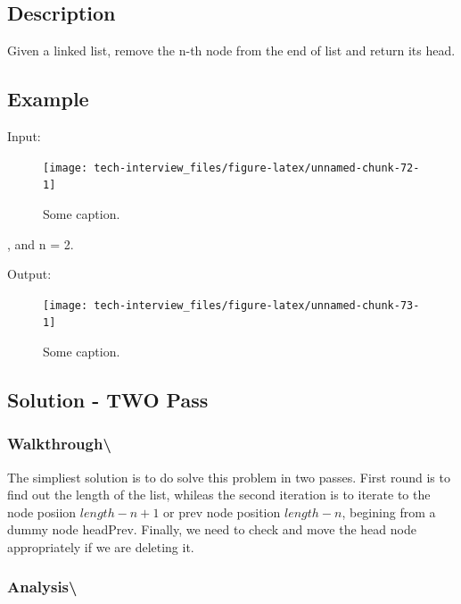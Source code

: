 \documentclass[]{book}
\begin{document}
\hypertarget{description-97}{%
\subsection{Description}\label{description-97}}

Given a linked list, remove the n-th node from the end of list and return its head.

\hypertarget{example-93}{%
\subsection{Example}\label{example-93}}

Input:

\begin{figure}
\texttt{[image: tech-interview\_files/figure-latex/unnamed-chunk-72-1]} \caption{Some caption.}\label{fig:unnamed-chunk-72}
\end{figure}

, and n = 2.

Output:

\begin{figure}
\texttt{[image: tech-interview\_files/figure-latex/unnamed-chunk-73-1]} \caption{Some caption.}\label{fig:unnamed-chunk-73}
\end{figure}

\hypertarget{solution---two-pass}{%
\subsection{Solution - TWO Pass}\label{solution---two-pass}}

\hypertarget{walkthrough-113}{%
\subsubsection{Walkthrough\textbackslash{}}\label{walkthrough-113}}

The simpliest solution is to do solve this problem in two passes. First round is to find out the length of the list,
whileas the second iteration is to iterate to the node posiion \(length -n + 1\) or prev node position \(length - n\),
begining from a dummy node headPrev. Finally, we need to check and move the head node appropriately if we are deleting
it.

\hypertarget{analysis-120}{%
\subsubsection{Analysis\textbackslash{}}\label{analysis-120}}
\end{document}
